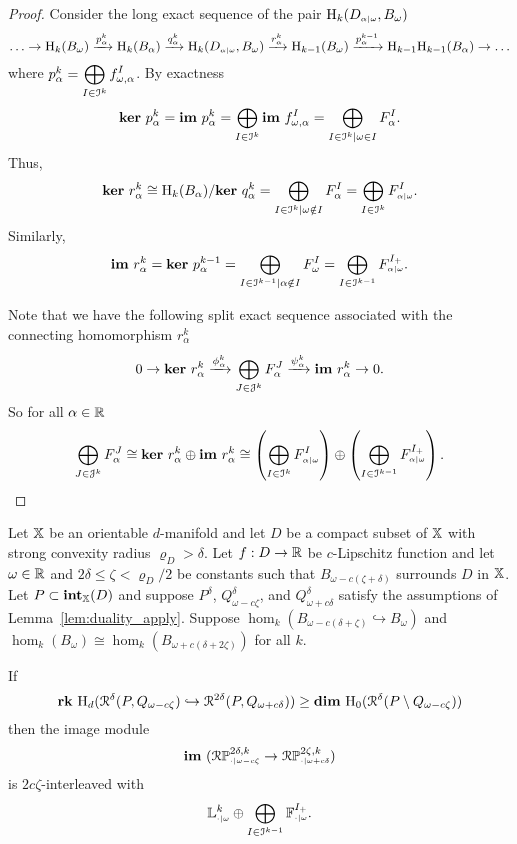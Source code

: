 \begin{proof}
  Consider the long exact sequence of the pair $\mathrm{H}_k(D_{\scriptscriptstyle \alpha\mid \omega}, B_\omega)$
  \[ \ldots\to \mathrm{H}_k(B_\omega)\xrightarrow{p_\alpha^k} \mathrm{H}_k(B_\alpha)\xrightarrow{q_\alpha^k}\mathrm{H}_k(D_{\scriptscriptstyle \alpha\mid \omega}, B_\omega)\xrightarrow{r_\alpha^k} \mathrm{H}_{k-1}(B_\omega)\xrightarrow{p_\alpha^{k-1}}\mathrm{H}_{k-1}\mathrm{H}_{k-1}(B_\alpha)\to\ldots\]
  where $p_\alpha^k = \displaystyle\bigoplus_{I\in\mathcal{I}^k} f_{\omega,\alpha}^I$.
  By exactness
  \[\mathbf{ker}~p_\alpha^k = \mathbf{im}~p_\alpha^k = \bigoplus_{I\in\mathcal{I}^k}\mathbf{im}~f_{\omega,\alpha}^I = \bigoplus_{I\in\mathcal{I}^k \mid \omega\in I} F_\alpha^I.\]
  Thus,
  \begin{align*}
    \mathbf{ker}~r_\alpha^k \cong \mathrm{H}_k(B_\alpha) / \mathbf{ker}~q_\alpha^k = \bigoplus_{I\in \mathcal{I}^k\mid \omega\notin I} F_\alpha^I = \bigoplus_{I\in\mathcal{I}^k} F_{\scriptscriptstyle \alpha\mid \omega}^I.
  \end{align*}
  Similarly,
  \begin{align*} \mathbf{im}~r_\alpha^k = \mathbf{ker}~p_\alpha^{k-1} = \bigoplus_{I\in\mathcal{I}^{k-1}\mid \alpha\notin I} F_\omega^I = \bigoplus_{I\in\mathcal{I}^{k-1}} F_{\scriptscriptstyle \alpha\mid \omega}^{I_+}.
  \end{align*}

  Note that we have the following split exact sequence associated with the connecting homomorphism $r_\alpha^k$
  \[ 0\to \mathbf{ker}~r_\alpha^k\xrightarrow{\phi_\alpha^k}\bigoplus_{J\in\mathcal{J}^k} F_\alpha^J\xrightarrow{\psi_\alpha^k}\mathbf{im}~r_\alpha^k\to 0.\]
  So for all $\alpha\in\mathbb{R}$
  \[ \bigoplus_{J\in\mathcal{J}^k} F_\alpha^J \cong \mathbf{ker}~r_\alpha^k\oplus \mathbf{im}~r_\alpha^k
    \cong\left(\bigoplus_{I\in\mathcal{I}^k} F_{\scriptscriptstyle \alpha\mid \omega}^I\right)\oplus\left(\bigoplus_{I\in\mathcal{I}^{k-1}} F_{\scriptscriptstyle \alpha\mid \omega}^{I_+}\right).\]
  \end{proof}

\begin{theorem}
  Let $\mathbb{X}$ be an orientable $d$-manifold and let $D$ be a compact subset of $\mathbb{X}$ with strong convexity radius $\varrho_D > \delta$.
  Let $f : D\to\mathbb{R}$ be $c$-Lipschitz function and let $\omega\in\mathbb{R}$ and $2\delta\leq\zeta < \varrho_D/2$ be constants such that $B_{\omega - c(\zeta +\delta)}$ surrounds $D$ in $\mathbb{X}$.
  Let $P\subset \mathbf{int}_{\mathbb{X}}(D)$ and suppose $P^\delta$, $Q_{\omega-c\zeta}^\delta$, and $Q_{\omega+c\delta}^\delta$ satisfy the assumptions of Lemma~\ref{lem:duality_apply}.
  Suppose $\hom_k(B_{\omega-c(\delta+\zeta)}\hookrightarrow B_\omega)$ and $\hom_k(B_\omega)\cong\hom_k(B_{\omega+c(\delta+2\zeta)})$ for all $k$.

  If
  \[\mathbf{rk}~\mathrm{H}_d(\mathcal{R}^\delta(P, Q_{\omega -c\zeta})\hookrightarrow \mathcal{R}^{2\delta}(P, Q_{\omega+c\delta})) \geq \mathbf{dim}~\mathrm{H}_0(\mathcal{R}^\delta(P\setminus Q_{\omega-c\zeta}))\]
  then the image module
  \[ \mathbf{im}~(\mathcal{R}\mathbb{P}_{\scriptscriptstyle \cdot\mid \omega-c\zeta}^{2\delta, k}\to \mathcal{R}\mathbb{P}_{\scriptscriptstyle \cdot\mid \omega+c\delta}^{2\zeta, k})\]
  is $2c\zeta$-interleaved with
  \[ \mathbb{L}_{\scriptscriptstyle \cdot\mid \omega}^k \oplus \bigoplus_{I\in \mathcal{I}^{k-1}} \mathbb{F}_{\scriptscriptstyle \cdot\mid \omega}^{I_+}.\]
\end{theorem}
